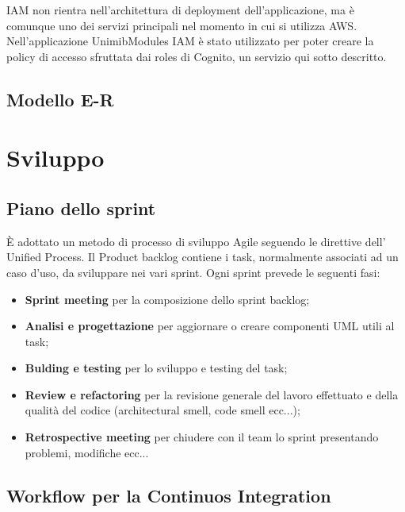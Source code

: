 \documentclass[12pt]{article}
\begin{document}
\begin{itemize}
\begin{figure}[H]
\end{figure}
IAM non rientra nell'architettura di deployment dell'applicazione, ma è comunque uno dei servizi principali nel momento in cui si utilizza AWS. Nell'applicazione UnimibModules IAM è stato utilizzato per poter creare la policy di accesso sfruttata dai roles di Cognito, un servizio qui sotto descritto.
\end{itemize}
\subsection{Modello E-R}
\section{Sviluppo}
\subsection{Piano dello sprint}
\`{E} adottato un metodo di processo di sviluppo Agile seguendo le direttive dell' Unified Process. Il Product backlog contiene i task, normalmente associati ad un caso d'uso,  da sviluppare nei vari sprint. Ogni sprint prevede le seguenti fasi:
\begin{itemize}
\item {\textbf {Sprint meeting}} per la composizione dello sprint backlog;
\item {\textbf {Analisi e progettazione}}  per aggiornare o creare componenti UML utili al task;
\item {\textbf {Bulding e testing}}  per lo sviluppo e testing del task;
\item {\textbf {Review e refactoring}} per la revisione generale del lavoro effettuato e della qualità del codice (architectural smell, code smell ecc...);
\item {\textbf {Retrospective meeting}} per chiudere con il team lo sprint presentando problemi, modifiche ecc...

\end{itemize}

\subsection{Workflow per la Continuos Integration}


\end{document}
